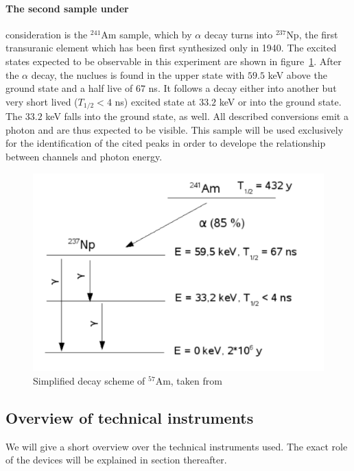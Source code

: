 \paragraph{The second sample under}
consideration is the $^{241}$Am sample, which by $\alpha$ decay turns into $^{237}$Np, the 
first transuranic element which has been first synthesized only in 1940. The excited 
states expected to be observable in this experiment are shown in figure~\ref{fig:decay_scheme_Am}. 
After the $\alpha$ decay, the nuclues is found in the upper state with $59.5$ keV 
above the ground state and a half live of $67$ ns. It follows a decay either into another 
but very short lived ($T_{1/2} < 4$ ns) excited state at $33.2$ keV or into the 
ground state. The $33.2$ keV falls into the ground state, as well. All described conversions 
emit a photon and are thus expected to be visible. This sample will be used exclusively for the 
identification of the cited peaks in order to develope the relationship between channels and 
photon energy. 
\begin{figure}
    \begin{centering}
        \includegraphics[width=0.70\linewidth]{figures/decay_scheme_Am}
        \caption{Simplified decay scheme of $^{57}$Am, taken from~\cite{ver}}
        \label{fig:decay_scheme_Am}
    \end{centering}
\end{figure}


\subsection{Overview of technical instruments}
We will give a short overview over the technical instruments used. The exact role 
of the devices will be explained in section thereafter.
\label{sub:overview_of_technical_instruments}
